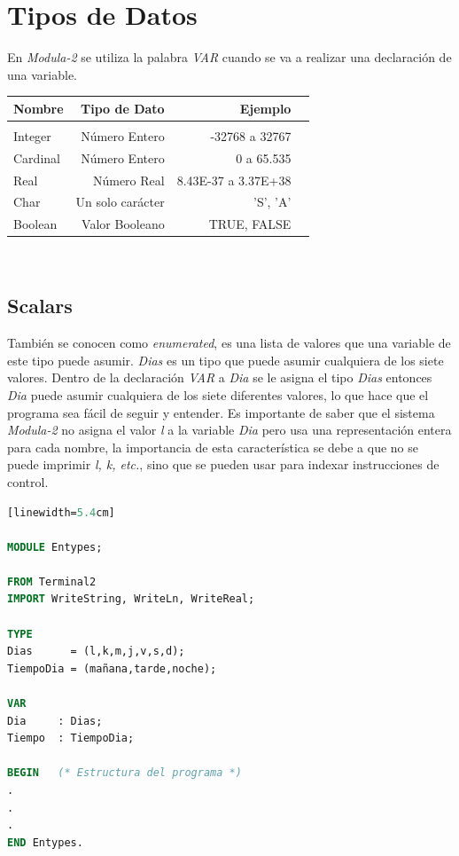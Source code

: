 \documentclass[10pt,journal,compsoc]{IEEEtran}
\begin{document}
\section{Tipos de Datos}
En \emph{Modula-2} se utiliza la palabra \emph{VAR} cuando se va a realizar una declaraci\'on de una variable. 
\newline\newline\newline
\begin{tabular}{ l r r r }
	Nombre & Tipo de Dato & Ejemplo \\
	\hline\\
	Integer & N\'umero Entero & -32768 a 32767 \\
	Cardinal & N\'umero Entero & 0 a 65.535 \\
	Real & N\'umero Real &  8.43E-37 a 3.37E+38 \\
	Char &  Un solo car\'acter & 'S', 'A'\\
	Boolean & Valor Booleano & TRUE, FALSE\\	
\end{tabular}\\\newline\newline\newline

\subsection{Scalars}
Tambi\'en se conocen como \emph{enumerated}, es una lista de valores que una variable de este tipo puede asumir. \emph{Dias} es un tipo que puede asumir cualquiera de los siete valores. Dentro de la declaraci\'on \emph{VAR} a \emph{Dia} se le asigna el tipo \emph{Dias} entonces \emph{Dia} puede asumir cualquiera de los siete diferentes valores, lo que hace que el programa sea f\'acil de seguir y entender. Es importante de saber que el sistema \emph{Modula-2} no asigna el valor \emph{l} a la variable \emph{Dia} pero usa una representaci\'on entera para cada nombre, la importancia de esta caracter\'istica se debe a que no se puede imprimir \emph{l, k, etc.}, sino que se pueden usar para indexar instrucciones de control.

\begin{lstlisting}[language=Modula-2, caption = {C\'odigo de declaraci\'on para un Scalar}][linewidth=5.4cm]

MODULE Entypes;

FROM Terminal2 
IMPORT WriteString, WriteLn, WriteReal;

TYPE 
Dias      = (l,k,m,j,v,s,d);
TiempoDia = (mañana,tarde,noche);

VAR 
Dia		: Dias;
Tiempo	: TiempoDia;

BEGIN	(* Estructura del programa *)
.
.
.
END Entypes.
\end{lstlisting}
\end{document}
